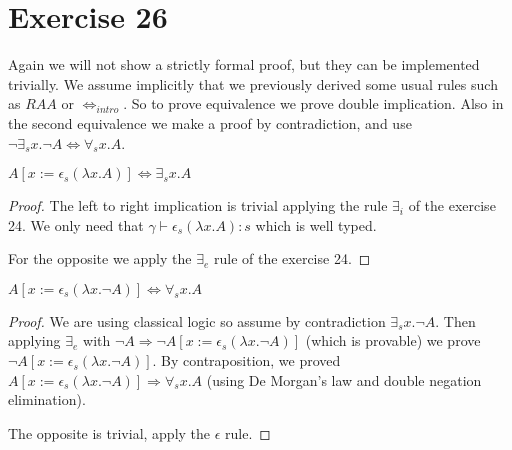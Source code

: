\section{Exercise 26}

Again we will not show a strictly formal proof, but they can be implemented
trivially. We assume implicitly that we previously derived some usual rules
such as $RAA$ or $\iff_{intro}$. So to prove equivalence we prove
double implication. Also in the second equivalence we make a proof
by contradiction, and use $\neg \exists_s x. \neg A \iff \forall_s x . A $.

\begin{theorem}
  $A[x:=\epsilon_s (\lambda x. A)] \Leftrightarrow \exists_s x . A$
\end{theorem}
\begin{proof}

  The left to right implication is trivial applying the rule $\exists_i$
  of the exercise 24. We only need that
  $\gamma \vdash \epsilon_s (\lambda x. A) : s$ which is well typed.

  For the opposite we apply the $\exists_e$ rule of the exercise 24.

\end{proof}


\begin{theorem}
  $A[x:=\epsilon_s (\lambda x. \neg A)] \Leftrightarrow \forall_s x . A$
\end{theorem}
\begin{proof}
  We are using classical logic so assume by contradiction
  $\exists_s x . \neg A$. Then applying $\exists_e$ with
  $\neg A \Rightarrow \neg A [x:=\epsilon_s (\lambda x. \neg A)]$
  (which is provable) we prove $\neg A [x:=\epsilon_s (\lambda x. \neg A)]$.
  By contraposition, we proved
  $A[x:=\epsilon_s (\lambda x. \neg A)] \Rightarrow \forall_s x . A$ (using
  De Morgan's law and double negation elimination).

  The opposite is trivial, apply the $\epsilon$ rule.
\end{proof}
